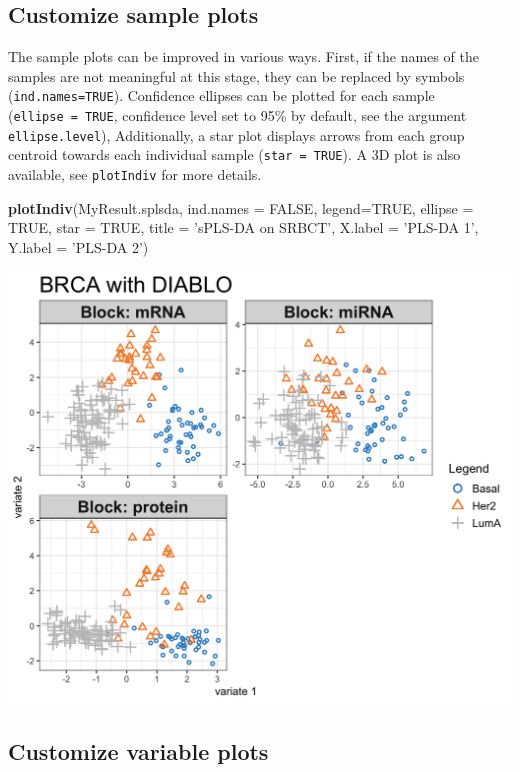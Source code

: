 \documentclass[]{book}
\newenvironment{Shaded}{\begin{snugshade}}{\end{snugshade}}
\newcommand{\KeywordTok}[1]{\textcolor[rgb]{0.13,0.29,0.53}{\textbf{#1}}}
\newcommand{\DataTypeTok}[1]{\textcolor[rgb]{0.13,0.29,0.53}{#1}}
\newcommand{\StringTok}[1]{\textcolor[rgb]{0.31,0.60,0.02}{#1}}
\newcommand{\OtherTok}[1]{\textcolor[rgb]{0.56,0.35,0.01}{#1}}
\newcommand{\NormalTok}[1]{#1}
\theoremstyle{definition}
\theoremstyle{definition}
\theoremstyle{definition}
\theoremstyle{remark}
\begin{document}
\subsection{Customize sample plots}\label{splsda:plotIndiv}

The sample plots can be improved in various ways. First, if the names of
the samples are not meaningful at this stage, they can be replaced by
symbols (\texttt{ind.names=TRUE}). Confidence ellipses can be plotted
for each sample (\texttt{ellipse\ =\ TRUE}, confidence level set to 95\%
by default, see the argument \texttt{ellipse.level}), Additionally, a
star plot displays arrows from each group centroid towards each
individual sample (\texttt{star\ =\ TRUE}). A 3D plot is also available,
see \texttt{plotIndiv} for more details.

\begin{Shaded}
\begin{Highlighting}[]
\KeywordTok{plotIndiv}\NormalTok{(MyResult.splsda, }\DataTypeTok{ind.names =} \OtherTok{FALSE}\NormalTok{, }\DataTypeTok{legend=}\OtherTok{TRUE}\NormalTok{,}
          \DataTypeTok{ellipse =} \OtherTok{TRUE}\NormalTok{, }\DataTypeTok{star =} \OtherTok{TRUE}\NormalTok{, }\DataTypeTok{title =} \StringTok{'sPLS-DA on SRBCT'}\NormalTok{,}
          \DataTypeTok{X.label =} \StringTok{'PLS-DA 1'}\NormalTok{, }\DataTypeTok{Y.label =} \StringTok{'PLS-DA 2'}\NormalTok{)}
\end{Highlighting}
\end{Shaded}

\begin{center}\includegraphics[width=0.5\linewidth]{Figures/unnamed-chunk-4-1} \end{center}

\subsection{Customize variable plots}\label{customize-variable-plots}
\end{document}
